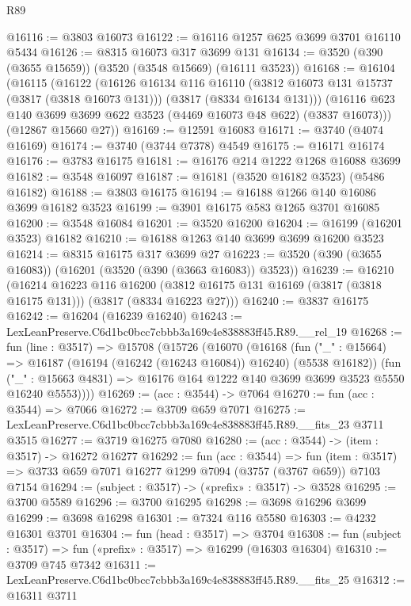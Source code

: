 \begin{lexlean}{R89}
\begin{coremodule}
@16116 := @3803 @16073
@16122 := @16116 @1257 @625 @3699 @3701 @16110 @5434
@16126 := @8315 @16073 @317 @3699 @131
@16134 := @3520 (@390 (@3655 @15659)) (@3520 (@3548 @15669) (@16111 @3523))
@16168 := @16104
    (@16115
      (@16122
        (@16126
          @16134
          @116
          @16110
          (@3812 @16073 @131 @15737 (@3817 (@3818 @16073 @131)))
          (@3817 (@8334 @16134 @131)))
        (@16116 @623 @140 @3699 @3699 @622 @3523 (@4469 @16073 @48 @622) (@3837 @16073)))
      (@12867 @15660 @27))
@16169 := @12591 @16083
@16171 := @3740 (@4074 @16169)
@16174 := @3740 (@3744 @7378) @4549
@16175 := @16171 @16174
@16176 := @3783 @16175
@16181 := @16176 @214 @1222 @1268 @16088 @3699
@16182 := @3548 @16097
@16187 := @16181 (@3520 @16182 @3523) (@5486 @16182)
@16188 := @3803 @16175
@16194 := @16188 @1266 @140 @16086 @3699 @16182 @3523
@16199 := @3901 @16175 @583 @1265 @3701 @16085
@16200 := @3548 @16084
@16201 := @3520 @16200
@16204 := @16199 (@16201 @3523) @16182
@16210 := @16188 @1263 @140 @3699 @3699 @16200 @3523
@16214 := @8315 @16175 @317 @3699 @27
@16223 := @3520 (@390 (@3655 @16083)) (@16201 (@3520 (@390 (@3663 @16083)) @3523))
@16239 := @16210
    (@16214
      @16223
      @116
      @16200
      (@3812 @16175 @131 @16169 (@3817 (@3818 @16175 @131)))
      (@3817 (@8334 @16223 @27)))
@16240 := @3837 @16175
@16242 := @16204 (@16239 @16240)
@16243 := LexLeanPreserve.C6d1bc0bcc7cbbb3a169c4e838883ff45.R89.__rel_19
@16268 := fun (line : @3517) =>
  @15708
    (@15726
      (@16070
        (@16168
          (fun ("_" : @15664) => @16187 (@16194 (@16242 (@16243 @16084)) @16240) (@5538 @16182))
          (fun ("_" : @15663 @4831) =>
          @16176 @164 @1222 @140 @3699 @3699 @3523 @5550 @16240 @5553))))
@16269 := (acc : @3544) -> @7064
@16270 := fun (acc : @3544) => @7066
@16272 := @3709 @659 @7071
@16275 := LexLeanPreserve.C6d1bc0bcc7cbbb3a169c4e838883ff45.R89.__fits_23 @3711 @3515
@16277 := @3719 @16275 @7080
@16280 := (acc : @3544) -> (item : @3517) -> @16272 @16277
@16292 := fun (acc : @3544) =>
  fun (item : @3517) => @3733 @659 @7071 @16277 @1299 @7094 (@3757 (@3767 @659)) @7103 @7154
@16294 := (subject : @3517) -> («prefix» : @3517) -> @3528
@16295 := @3700 @5589
@16296 := @3700 @16295
@16298 := @3698 @16296 @3699
@16299 := @3698 @16298
@16301 := @7324 @116 @5580
@16303 := @4232 @16301 @3701
@16304 := fun (head : @3517) => @3704
@16308 := fun (subject : @3517) => fun («prefix» : @3517) => @16299 (@16303 @16304)
@16310 := @3709 @745 @7342
@16311 := LexLeanPreserve.C6d1bc0bcc7cbbb3a169c4e838883ff45.R89.__fits_25
@16312 := @16311 @3711

\end{coremodule}
\end{lexlean}
